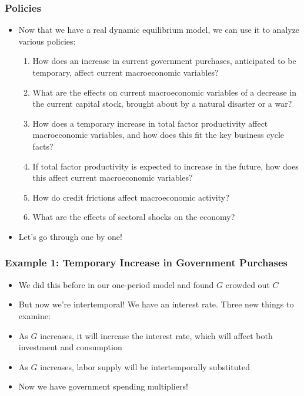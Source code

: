 \documentclass{beamer}
\begin{document}
\begin{frame}
\frametitle[alignment=center]{Policies} 
\begin{itemize}
\item Now that we have a real dynamic equilibrium model, we can use it to analyze various policies:
\begin{enumerate}
\item How does an increase in current government purchases, anticipated to be temporary, affect current macroeconomic variables?
\item What are the effects on current macroeconomic variables of a decrease in the current capital stock, brought about by a natural disaster or a war?
\item How does a temporary increase in total factor productivity affect macroeconomic variables, and how does this fit the key business cycle facts?
\item If total factor productivity is expected to increase in the future, how does this affect current macroeconomic variables?
\item How do credit frictions affect macroeconomic activity?
\item What are the effects of sectoral shocks on the economy?
\end{enumerate}
\item Let's go through one by one!
\end{itemize}
\end{frame}

\begin{frame}
\frametitle[alignment=center]{Example 1: Temporary Increase in Government Purchases} 
\begin{itemize}
\item We did this before in our one-period model and found $G$  crowded out $C$
\bigskip
\item But now we're intertemporal!  We have an interest rate.  Three new things to examine:
\bigskip
\item As $G$ increases, it will increase the interest rate, which will affect both investment and consumption
\bigskip
\item As $G$ increases, labor supply will be intertemporally substituted 
\bigskip
\item Now we have government spending multipliers!
\end{itemize}
\end{frame}
\end{document}
